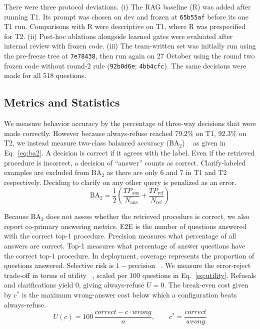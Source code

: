 \documentclass[runningheads]{llncs}
\newcommand{\BA}{\ensuremath{\mathrm{BA}_2}}
\begin{document}
{There were three protocol deviations. (i) The RAG baseline (R) was added after running T1. Its prompt was chosen on dev and frozen at \texttt{65b55af} before its one T1 run. Comparisons with R were descriptive on T1, where R was prespecified for T2. (ii) Post-hoc ablations alongside learned gates were evaluated after internal review with frozen code. (iii) The team-written set was initially run using the pre-freeze tree at \texttt{7e78438}, then run again on 27 October using the round two frozen code without round-2 rule (\texttt{92b0d6e}; \texttt{4bb4cfc}). The same decisions were made for all 518 questions.}

\subsection{Metrics and Statistics}\label{sec:metrics}

{We measure behavior accuracy by the percentage of three-way decisions that were made correctly. However because always-refuse reached 79.2\% on T1, 92.3\% on T2, we instead measure two-class balanced accuracy (\BA{}) ~\cite{brodersen2010} as given in Eq.~\eqref{eq:ba2}. A decision is correct if it agrees with the label. Even if the retrieved procedure is incorrect, a decision of ``answer'' counts as correct. Clarify-labeled examples are excluded from \BA{} as there are only 6 and 7 in T1 and T2 respectively. Deciding to clarify on any other query is penalized as an error.}
\begin{equation}
\BA = \frac{1}{2}\left(\frac{\mathit{TP}_\mathrm{ans}}{N_\mathrm{ans}} + \frac{\mathit{TP}_\mathrm{ref}}{N_\mathrm{ref}}\right)\label{eq:ba2}
\end{equation}

{Because \BA{} does not assess  whether the retrieved procedure is correct, we also report co-primary answering metrics. E2E is the number of questions answered with the correct top-1 procedure. Precision measures what percentage of all answers are correct. Top-1 measures what percentage of answer questions have the correct top-1 procedure. In deployment, coverage represents the proportion of questions answered. Selective risk is $1-\text{precision}$ ~\cite{elyaniv2010}. We measure the error-reject trade-off in terms of utility ~\cite{chow1970}, scaled per 100 questions in Eq.~\eqref{eq:utility}. Refusals and clarifications yield 0, giving always-refuse $U=0$. The break-even cost given by $c^*$ is the maximum wrong-answer cost below which a configuration beats always-refuse.}
\begin{equation}
U(c) = 100\,\frac{\mathit{correct} - c\cdot\mathit{wrong}}{n}, \qquad c^* = \frac{\mathit{correct}}{\mathit{wrong}}\label{eq:utility}
\end{equation}
 
\end{document}
